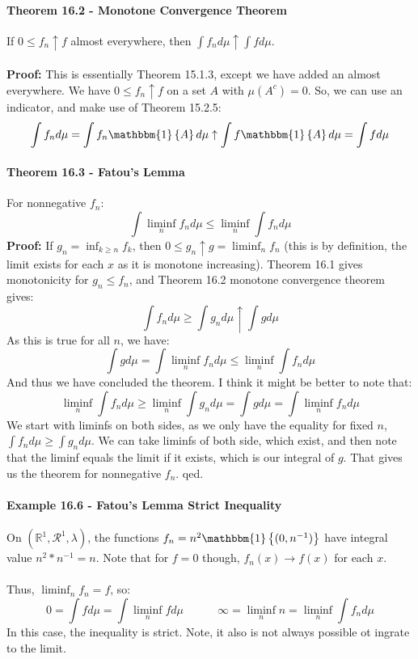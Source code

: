 \documentclass[12pt,a4paper]{article}
\newcommand{\1}[1]{\mathbbm{1}\left\{ #1 \right\}}
\newcommand{\R}{\mathbb{R}}
\newcommand{\rcal}{\mathcal{R}}
\begin{document}
\paragraph{Theorem 16.2 - Monotone Convergence Theorem} If $0 \leq f_n \uparrow f$ almost everywhere, then $\int f_n d\mu \uparrow \int f d\mu$.
\\\\
\textbf{Proof:} This is essentially Theorem 15.1.3, except we have added an almost everywhere. We have $0 \leq f_n \uparrow f$ on a set $A$ with $\mu(A^c) = 0$. So, we can use an indicator, and make use of Theorem 15.2.5:
$$
	\int f_n d\mu = \int f_n\1{A} d\mu \uparrow \int f\1{A} d\mu = \int f d\mu
$$

\paragraph{Theorem 16.3 - Fatou's Lemma} For nonnegative $f_n$:
$$
	\int \liminf_n f_n d\mu \leq \liminf_n \int f_n d\mu
$$
\textbf{Proof:} If $g_n = \inf_{k \geq n} f_k$, then $0 \leq g_n \uparrow g = \liminf_n f_n$ (this is by definition, the limit exists for each $x$ as it is monotone increasing). Theorem 16.1 gives monotonicity for $g_n \leq f_n$, and Theorem 16.2 monotone convergence theorem gives:
$$
	\int f_n d\mu \geq \int g_n d\mu \uparrow \int g d\mu
$$
As this is true for all $n$, we have:
$$
	\int g d\mu = \int \liminf_n f_n d\mu \leq \liminf_n \int f_n d\mu
$$
And thus we have concluded the theorem. I think it might be better to note that:
$$
	\liminf_n \int f_n d\mu \geq \liminf_n \int g_n d\mu = \int g d\mu =
	\int \liminf_n f_n d\mu
$$
We start with liminfs on both sides, as we only have the equality for fixed $n$, $\int f_n d\mu \geq \int g_n d\mu$. We can take liminfs of both side, which exist, and then note that the liminf equals the limit if it exists, which is our integral of $g$. That gives us the theorem for nonnegative $f_n$. qed.

\paragraph{Example 16.6 - Fatou's Lemma Strict Inequality} On $(\R^1, \rcal^1, \lambda)$, the functions $f_n = n^2\1{(0,n^{-1})}$ have integral value $n^2 * n^{-1} = n$. Note that for $f = 0$ though, $f_n(x) \to f(x)$ for each $x$.
\\\\
Thus, $\liminf_n f_n = f$, so:
$$
	0 = \int f d\mu = \int \liminf_n f d\mu \quad\quad\quad
	\infty = \liminf_n n = \liminf_n \int f_n d\mu
$$
In this case, the inequality is strict. Note, it also is not always possible ot ingrate to the limit.
\end{document}
